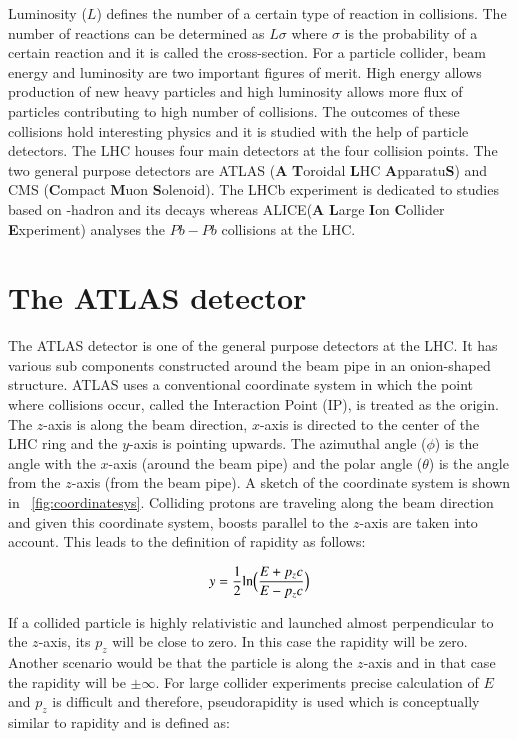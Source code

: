 Luminosity ($L$) defines the number of a certain type of reaction in collisions. The number of reactions can be determined as $L\sigma$ where $\sigma$ is the 
probability of a certain reaction and it is called the cross-section. For a particle collider, beam energy and luminosity are two important figures of merit. 
High energy allows production of new heavy particles and high luminosity allows more flux of particles contributing to high number of collisions. The outcomes
of these collisions hold interesting physics and it is studied with the help of particle detectors. The LHC houses four main detectors at the four collision
points. The two general purpose detectors are ATLAS (\textbf{A} \textbf{T}oroidal \textbf{L}HC \textbf{A}pparatu\textbf{S})\cite{TheATLASCollaboration_2008} and
CMS (\textbf{C}ompact \textbf{M}uon \textbf{S}olenoid)\cite{TheCMSCollaboration_2008}. The LHCb experiment\cite{TheLHCbCollaboration_2008} is dedicated to 
studies based on \PB-hadron and its decays whereas ALICE(\textbf{A} \textbf{L}arge \textbf{I}on \textbf{C}ollider \textbf{E}xperiment)\cite{TheALICECollaboration_2008}
analyses the $Pb-Pb$ collisions at the LHC. 


\section{The ATLAS detector}
The ATLAS detector is one of the general purpose detectors at the LHC. It has various sub components constructed around the beam pipe in an onion-shaped structure.
ATLAS uses a conventional coordinate system in which the point where collisions occur, called the Interaction Point (IP), is treated as the origin. The 
$z$-axis is along the beam direction, $x$-axis is directed to the center of the LHC ring and the $y$-axis is pointing upwards. The azimuthal angle ($\phi$) 
is the angle with the $x$-axis (around the beam pipe) and the polar angle ($\theta$) is the angle from the $z$-axis (from the beam pipe). A sketch of the coordinate
system is shown in ~\cref{fig:coordinatesys}. Colliding protons are traveling along the beam direction and given this coordinate system, boosts parallel to the $z$-axis are 
taken into account. This leads to the definition of rapidity as follows:

\begin{equation*}
    y = \frac{1}{2}\text{ln} \Bigl(\frac{E+p_zc}{E-p_zc}\Bigl)
\end{equation*}


If a collided particle is highly relativistic and launched almost perpendicular to the $z$-axis, its $p_z$ will be close to zero. In this
case the rapidity will be zero. Another scenario would be that the particle is along the $z$-axis and in that case the rapidity will be $\pm \infty$. For large
collider experiments precise calculation of $E$ and $p_z$ is difficult and therefore, pseudorapidity is used which is conceptually similar to rapidity and is 
defined as:

